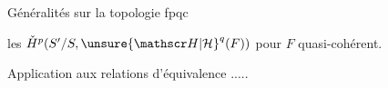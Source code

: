 Généralités sur la topologie fpqc

les $\check H^p(S'/S,{\unsure{\mathscr H|\mathcal H}}^q(F))$ pour $F$ quasi-cohérent.

Application aux relations d'équivalence .....

